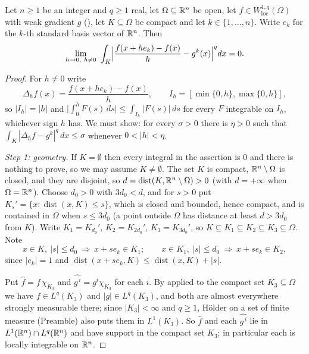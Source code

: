\begin{lemma}
Let $n\ge1$ be an integer and $q\ge1$ real, let $\Omega\subseteq\mathbb{R}^n$ be open,
let $f\in W^{1,q}_{\mathrm{loc}}(\Omega)$ with weak gradient $g$
(), let $K\subseteq\Omega$ be compact and let
$k\in\{1,\dots,n\}$.  Write $e_k$ for the $k$-th standard basis vector of
$\mathbb{R}^n$.  Then
\[
\lim_{h\to0,\ h\ne0}\ \int_K\Bigl|\frac{f(x+he_k)-f(x)}{h}-g^k(x)\Bigr|^q dx=0 .
\]
\end{lemma}
\begin{proof}
For $h\ne0$ write
\[
\Delta_hf(x)=\frac{f(x+he_k)-f(x)}{h},
\qquad
I_h=[\min\{0,h\},\max\{0,h\}],
\]
so $|I_h|=|h|$ and $\bigl|\int_0^hF(s)\,ds\bigr|\le\int_{I_h}|F(s)|\,ds$ for
every $F$ integrable on $I_h$, whichever sign $h$ has.  We must show: for every
$\sigma>0$ there is $\eta>0$ such that
$\int_K|\Delta_hf-g^k|^q\,dx\le\sigma$ whenever $0<|h|<\eta$.

\emph{Step 1: geometry.}  If $K=\emptyset$ then every integral in the assertion
is $0$ and there is nothing to prove, so we may assume $K\ne\emptyset$.  The set
$K$ is compact, $\mathbb{R}^n\setminus\Omega$ is closed, and they are disjoint, so
$d=\operatorname{dist}(K,\mathbb{R}^n\setminus\Omega)>0$ (with $d=+\infty$ when
$\Omega=\mathbb{R}^n$).  Choose $d_0>0$ with $3d_0<d$, and for $s>0$ put
$K_s'=\{x:\operatorname{dist}(x,K)\le s\}$, which is closed and bounded, hence
compact, and is contained in $\Omega$ when $s\le3d_0$ (a point outside $\Omega$
has distance at least $d>3d_0$ from $K$).  Write
$K_1=K_{d_0}'$, $K_2=K_{2d_0}'$, $K_3=K_{3d_0}'$, so
$K\subseteq K_1\subseteq K_2\subseteq K_3\subseteq\Omega$.  Note
\[
x\in K,\ |s|\le d_0\ \Longrightarrow\ x+se_k\in K_1;
\qquad
x\in K_1,\ |s|\le d_0\ \Longrightarrow\ x+se_k\in K_2,
\tag{1}
\]
since $|e_k|=1$ and
$\operatorname{dist}(x+se_k,K)\le\operatorname{dist}(x,K)+|s|$.

Put $\widehat f=f\,\chi_{K_3}$ and $\widehat{g^{\,i}}=g^i\chi_{K_3}$ for each
$i$.  By  applied to the compact set $K_3\subseteq\Omega$
we have $f\in L^q(K_3)$ and $|g|\in L^q(K_3)$, and both are almost everywhere
strongly measurable there; since $|K_3|<\infty$ and $q\ge1$, H\"older on a set
of finite measure (Preamble) also puts them in $L^1(K_3)$.  So $\widehat f$ and
each $\widehat{g^{\,i}}$ lie in $L^1(\mathbb{R}^n)\cap L^q(\mathbb{R}^n)$ and have support in
the compact set $K_3$; in particular each is locally integrable on $\mathbb{R}^n$.


\end{proof}

